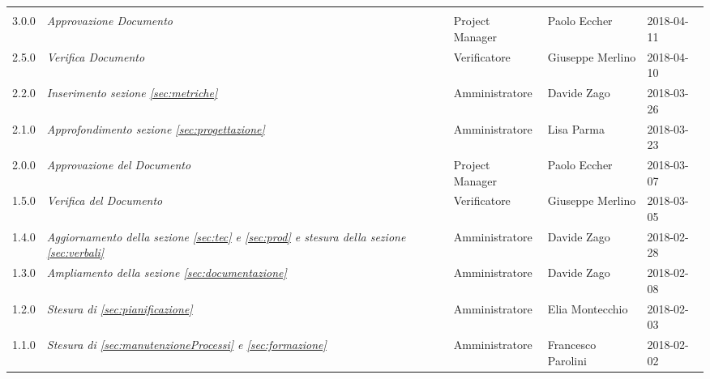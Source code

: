 \newpage 
\section*{}
\begin{table}[H]
	\centering
	\begin{tabular}{p{2cm}|C{4cm}|C{3cm}|C{3cm}|R{2cm}}

		
		
			 &  & &  & \\
		
		
			3.0.0  & \emph{Approvazione Documento} & Project Manager & Paolo Eccher &  2018-04-11 \\
		\hline
		
			2.5.0  & \emph{Verifica Documento} & Verificatore & Giuseppe Merlino &  2018-04-10 \\
		\hline
		
		2.2.0  & \emph{Inserimento sezione \ref{sec:metriche}} & Amministratore & Davide Zago &  2018-03-26 \\
		\hline
		
		2.1.0  & \emph{Approfondimento sezione \ref{sec:progettazione}} & Amministratore & Lisa Parma &  2018-03-23 \\
		\hline
		
		2.0.0  & \emph{Approvazione del Documento} & Project Manager & Paolo Eccher&  2018-03-07 \\
		\hline
		
		1.5.0  &  \emph{Verifica del Documento} & Verificatore & Giuseppe Merlino & 2018-03-05 \\
		\hline
		
		1.4.0  & \emph{Aggiornamento della sezione \ref{sec:tec} e \ref{sec:prod} e stesura della sezione \ref{sec:verbali}} &  Amministratore & Davide Zago & 2018-02-28  \\
		\hline
		
		1.3.0  & \emph{Ampliamento della sezione \ref{sec:documentazione}} &  Amministratore & Davide Zago & 2018-02-08  \\
		\hline
		
		1.2.0  & \emph{Stesura di \ref{sec:pianificazione}} &  Amministratore & Elia Montecchio & 2018-02-03  \\
		\hline
		
		1.1.0  & \emph{Stesura di \ref{sec:manutenzioneProcessi} e \ref{sec:formazione}} &  Amministratore & Francesco Parolini & 2018-02-02  \\
		\hline
		

\end{tabular}
\end{table}
